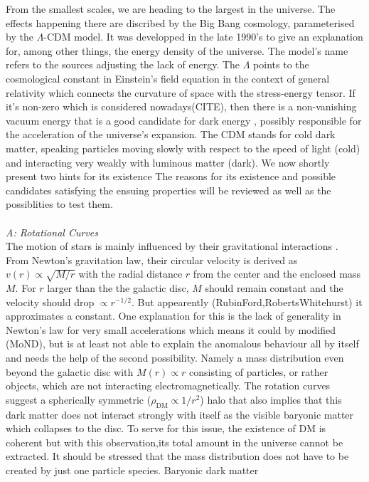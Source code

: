 From the smallest scales, we are heading to the largest in the universe. The effects happening there are discribed by the Big Bang cosmology, parameterised
by the $\Lambda$-CDM model. It was developped in the late 1990's \cite{LambdaCDM} to give an explanation for, among other things, the energy density of the 
universe. The model's name refers to the sources adjusting the lack of energy. The $\Lambda$ points to the cosmological constant in Einstein's field equation
in the context of general relativity which connects the curvature of space with the stress-energy tensor. If it's non-zero which is considered nowadays(CITE), 
then there is a non-vanishing vacuum energy that is a good candidate for dark energy \cite{14041938}, possibly responsible for the acceleration of the universe's expansion.
The CDM stands for cold dark matter, speaking particles moving slowly with respect to the speed of light (cold) and interacting very weakly with luminous
matter (dark). We now shortly present two hints for its existence
The reasons for its existence and possible candidates satisfying the ensuing properties will be reviewed as well as the possiblities to test them.\\
\\ \textit{A: Rotational Curves}\\
\noindent The motion of stars is mainly influenced by their gravitational interactions \cite{LectDMLis}. From Newton's gravitation law, their circular velocity 
is derived as
$v(r)\propto\sqrt{M/r}$ with the radial distance $r$ from the center and the enclosed mass $M$. For $r$ larger than the the galactic disc, $M$ should remain
constant and the velocity should drop $\propto r^{-1/2}$. But appearently (RubinFord,RobertsWhitehurst) it approximates a constant. One explanation for this
is the lack of generality in Newton's law for very small accelerations which means it could by modified (MoND), but is at least not able to 
explain the anomalous behaviour all by itself \cite{11015122}\cite{160607790} and needs the help of the second possibility. Namely a mass distribution even beyond the galactic
disc with $M(r)\propto r$ consisting of particles, or rather objects, which are not interacting electromagnetically. The rotation curves suggest a 
spherically symmetric ($\rho_\text{DM}\propto 1/r^2$) halo that also implies that this dark matter does not interact strongly with itself as the visible 
baryonic matter which collapses to the disc. To serve for this issue, the existence of DM is coherent but with this observation,its total amount in the 
universe cannot be extracted. It should be stressed that the mass distribution does not have to be created by just one particle species. Baryonic dark matter
